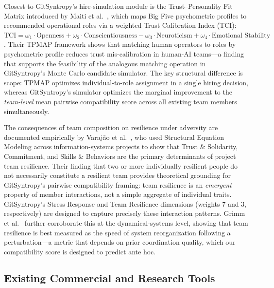 \documentclass[conference]{IEEEtran}
\begin{document}
Closest to GitSyntropy's hire-simulation module is the
Trust--Personality Fit Matrix introduced by Maiti et al.~\cite{maiti2025},
which maps Big Five psychometric profiles to recommended operational
roles via a weighted Trust Calibration Index (TCI):
$\text{TCI} = \omega_1 \cdot \text{Openness} +
\omega_2 \cdot \text{Conscientiousness} -
\omega_3 \cdot \text{Neuroticism} + \omega_4 \cdot
\text{Emotional Stability}$.  Their TPMAP framework shows that
matching human operators to roles by psychometric profile reduces
trust mis-calibration in human-AI teams---a finding that supports
the feasibility of the analogous matching operation in GitSyntropy's
Monte Carlo candidate simulator.  The key structural difference is
scope: TPMAP optimizes individual-to-role assignment in a single
hiring decision, whereas GitSyntropy's simulator optimizes the
marginal improvement to the \emph{team-level} mean pairwise
compatibility score across all existing team members simultaneously.

The consequences of team composition on resilience under adversity
are documented empirically by Varaj\~{a}o et al.~\cite{varajao2021},
who used Structural Equation Modeling across information-systems
projects to show that Trust \& Solidarity, Commitment, and Skills
\& Behaviors are the primary determinants of project team resilience.
Their finding that two or more individually resilient people do not
necessarily constitute a resilient team provides theoretical
grounding for GitSyntropy's pairwise compatibility framing: team
resilience is an \emph{emergent} property of member interactions,
not a simple aggregate of individual traits.  GitSyntropy's Stress
Response and Team Resilience dimensions (weights 7 and 3,
respectively) are designed to capture precisely these interaction
patterns.  Grimm et al.~\cite{grimm2023} further corroborate this at
the dynamical-systems level, showing that team resilience is best
measured as the speed of system reorganization following a
perturbation---a metric that depends on prior coordination quality,
which our compatibility score is designed to predict ante hoc.

\subsection{Existing Commercial and Research Tools}
\end{document}
